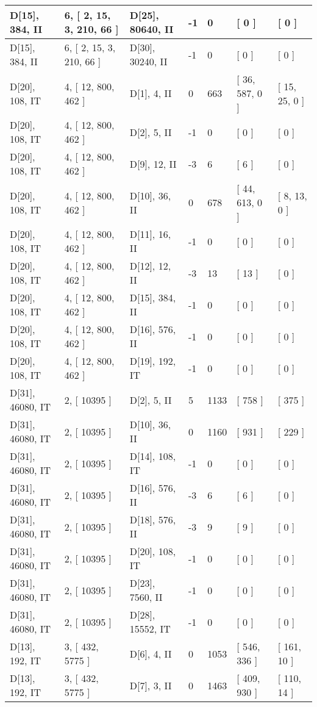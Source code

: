 \documentclass[9 pt]{scrartcl}
\begin{document}
\begin{longtable}{ |p{3em}|p{6em}|p{3em}|p{2em}|p{2em}|p{6em}|p{6em}| }
D[15], 384, II &6, [ 2, 15, 3, 210, 66 ] & D[25], 80640, II  & -1 & 0 & [ 0 ] & [ 0 ]\\ \hline
D[15], 384, II &6, [ 2, 15, 3, 210, 66 ] & D[30], 30240, II  & -1 & 0 & [ 0 ] & [ 0 ]\\ \hline
D[20], 108, IT &4, [ 12, 800, 462 ] & D[1], 4, II  & 0 & 663 & [ 36, 587, 0 ] & [ 15, 25, 0 ]\\ \hline
D[20], 108, IT &4, [ 12, 800, 462 ] & D[2], 5, II  & -1 & 0 & [ 0 ] & [ 0 ]\\ \hline
D[20], 108, IT &4, [ 12, 800, 462 ] & D[9], 12, II  & -3 & 6 & [ 6 ] & [ 0 ]\\ \hline
D[20], 108, IT &4, [ 12, 800, 462 ] & D[10], 36, II  & 0 & 678 & [ 44, 613, 0 ] & [ 8, 13, 0 ]\\ \hline
D[20], 108, IT &4, [ 12, 800, 462 ] & D[11], 16, II  & -1 & 0 & [ 0 ] & [ 0 ]\\ \hline
D[20], 108, IT &4, [ 12, 800, 462 ] & D[12], 12, II  & -3 & 13 & [ 13 ] & [ 0 ]\\ \hline
D[20], 108, IT &4, [ 12, 800, 462 ] & D[15], 384, II  & -1 & 0 & [ 0 ] & [ 0 ]\\ \hline
D[20], 108, IT &4, [ 12, 800, 462 ] & D[16], 576, II  & -1 & 0 & [ 0 ] & [ 0 ]\\ \hline
D[20], 108, IT &4, [ 12, 800, 462 ] & D[19], 192, IT  & -1 & 0 & [ 0 ] & [ 0 ]\\ \hline
D[31], 46080, IT &2, [ 10395 ] & D[2], 5, II  & 5 & 1133 & [ 758 ] & [ 375 ]\\ \hline
D[31], 46080, IT &2, [ 10395 ] & D[10], 36, II  & 0 & 1160 & [ 931 ] & [ 229 ]\\ \hline
D[31], 46080, IT &2, [ 10395 ] & D[14], 108, IT  & -1 & 0 & [ 0 ] & [ 0 ]\\ \hline
D[31], 46080, IT &2, [ 10395 ] & D[16], 576, II  & -3 & 6 & [ 6 ] & [ 0 ]\\ \hline
D[31], 46080, IT &2, [ 10395 ] & D[18], 576, II  & -3 & 9 & [ 9 ] & [ 0 ]\\ \hline
D[31], 46080, IT &2, [ 10395 ] & D[20], 108, IT  & -1 & 0 & [ 0 ] & [ 0 ]\\ \hline
D[31], 46080, IT &2, [ 10395 ] & D[23], 7560, II  & -1 & 0 & [ 0 ] & [ 0 ]\\ \hline
D[31], 46080, IT &2, [ 10395 ] & D[28], 15552, IT  & -1 & 0 & [ 0 ] & [ 0 ]\\ \hline
D[13], 192, IT &3, [ 432, 5775 ] & D[6], 4, II  & 0 & 1053 & [ 546, 336 ] & [ 161, 10 ]\\ \hline
D[13], 192, IT &3, [ 432, 5775 ] & D[7], 3, II  & 0 & 1463 & [ 409, 930 ] & [ 110, 14 ]\\ \hline

\end{longtable}
\end{document}
